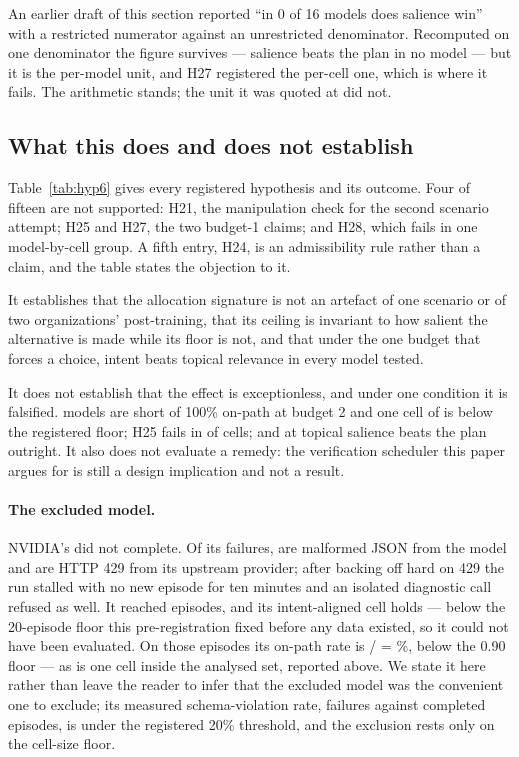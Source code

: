 An earlier draft of this section reported ``in 0 of 16 models does salience
win'' with a restricted numerator against an unrestricted denominator. Recomputed
on one denominator the figure survives --- salience beats the plan in no model ---
but it is the per-model unit, and H27 registered the per-cell one, which is where
it fails. The arithmetic stands; the unit it was quoted at did not.

\subsection{What this does and does not establish}\label{sec:sixlimits}

Table~\ref{tab:hyp6} gives every registered hypothesis and its outcome. Four of
fifteen are not supported: H21, the manipulation check for the second scenario
attempt; H25 and H27, the two budget-1 claims; and H28, which fails in one
model-by-cell group. A fifth entry, H24, is an admissibility rule rather than a
claim, and the table states the objection to it.

It establishes that the allocation signature is not an artefact of one scenario
or of two organizations' post-training, that its ceiling is invariant to how
salient the alternative is made while its floor is not, and that under the one
budget that forces a choice, intent beats topical relevance in every model
tested.

It does not establish that the effect is exceptionless, and under one condition
it is falsified. \SixShortOfPerfect{} models are short of 100\% on-path at
budget 2 and one cell of \SixHTwentyEightCells{} is below the registered floor;
H25 fails in \SixHTwentyFiveBelow{} of \SixHTwentyFiveCells{} cells; and at
\SixSalienceWonCell{} topical salience beats the plan outright. It also does not
evaluate a remedy: the verification scheduler this paper argues for is still a
design implication and not a result.

\paragraph{The excluded model.} NVIDIA's  did not
complete. Of its \SixNotRunFailures{} failures, \SixNotRunParse{} are malformed
JSON from the model and \SixNotRunFourTwoNine{} are HTTP 429 from its upstream
provider; after backing off hard on 429 the run stalled with no new episode for
ten minutes and an isolated diagnostic call refused as well. It reached
\SixNotRunEpisodes{} episodes, and its intent-aligned cell holds
\SixNotRunAlignedN{} --- below the 20-episode floor this pre-registration fixed
before any data existed, so it could not have been evaluated. On those
\SixNotRunAlignedN{} episodes its on-path rate is
\SixNotRunAlignedK/\SixNotRunAlignedN{} = \SixNotRunAlignedPct\%, below the
0.90 floor --- as is one cell inside the analysed set, reported above. We state it here rather
than leave the reader to infer that the excluded model was the convenient one to
exclude; its measured schema-violation rate, \SixNotRunFailures{} failures against
\SixNotRunEpisodes{} completed episodes, is under the registered 20\% threshold, and the exclusion rests only on the cell-size floor.

